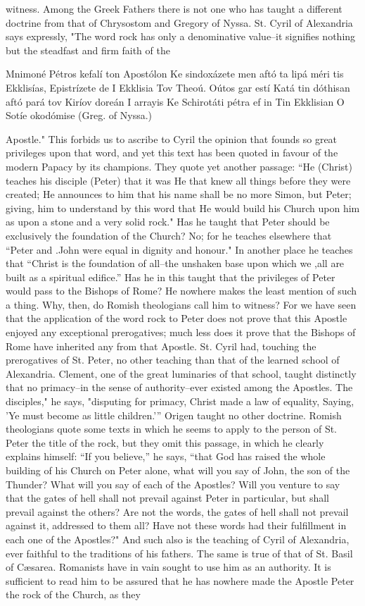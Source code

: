 witness. Among the Greek Fathers there is not one who has taught a different doctrine from that of Chrysostom and Gregory of Nyssa. St. Cyril of Alexandria says expressly, "The word rock has only a denominative value--it signifies nothing but the steadfast and firm faith of the

Mnimoné Pétros kefalí ton Apostólon Ke sindoxázete men aftó ta lipá méri tis Ekklisías, Epistrízete de I Ekklisia Tov Theoú. Oútos gar estí Katá tin dóthisan aftó pará tov Kiríov doreán I arrayis Ke Schirotáti pétra ef in Tin Ekklisian O Sotíe okodómise (Greg. of Nyssa.)

Apostle." This forbids us to ascribe to Cyril the opinion that founds so great privileges upon that word, and yet this text has been quoted in favour of the modern Papacy by its champions. They quote yet another passage: “He (Christ) teaches his disciple (Peter) that it was He that knew all things before they were created; He announces to him that his name shall be no more Simon, but Peter; giving, him to understand by this word that He would build his Church upon him as upon a stone and a very solid rock." Has he taught that Peter should be exclusively the foundation of the Church? No; for he teaches elsewhere that “Peter and .John were equal in dignity and honour." In another place he teaches that “Christ is the foundation of all--the unshaken base upon which we ,all are built as a spiritual edifice.” Has he in this taught that the privileges of Peter would pass to the Bishops of Rome? He nowhere makes the least mention of such a thing. Why, then, do Romish theologians call him to witness? For we have seen that the application of the word rock to Peter does not prove that this Apostle enjoyed any exceptional prerogatives; much less does it prove that the Bishops of Rome have inherited any from that Apostle. St. Cyril had, touching the prerogatives of St. Peter, no other teaching than that of the learned school of Alexandria. Clement, one of the great luminaries of that school, taught distinctly that no primacy--in the sense of authority--ever existed among the Apostles. The disciples," he says, "disputing for primacy, Christ made a law of equality, Saying, 'Ye must become as little children.’” Origen taught no other doctrine. Romish theologians quote some texts in which he seems to apply to the person of St. Peter the title of the rock, but they omit this passage, in which he clearly explains himself: “If you believe,” he says, “that God has raised the whole building of his Church on Peter alone, what will you say of John, the son of the Thunder? What will you say of each of the Apostles? Will you venture to say that the gates of hell shall not prevail against Peter in particular, but shall prevail against the others? Are not the words, the gates of hell shall not prevail against it, addressed to them all? Have not these words had their fulfillment in each one of the Apostles?" And such also is the teaching of Cyril of Alexandria, ever faithful to the traditions of his fathers. The same is true of that of St. Basil of Cæsarea. Romanists have in vain sought to use him as an authority. It is sufficient to read him to be assured that he has nowhere made the Apostle Peter the rock of the Church, as they 